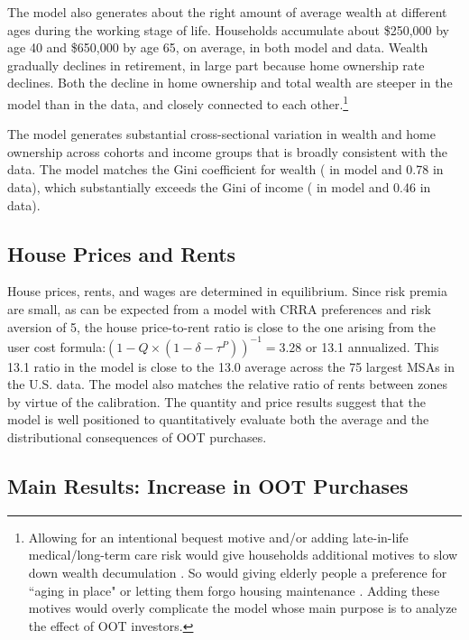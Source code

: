\documentclass[letterpaper,12pt,dvipsnames,usenames]{article}
\theoremstyle{definition}
\begin{document}
\begin{spacing}{1.25}
The model also generates about the right amount of average wealth at different ages during the working stage of life. Households accumulate about \$250,000 by age 40 and \$650,000 by age 65, on average, in both model and data. Wealth gradually declines in retirement, in large part because home ownership rate declines. Both the decline in home ownership and total wealth are steeper in the model than in the data, and closely connected to each other.\footnote{Allowing for an intentional bequest motive and/or adding late-in-life medical/long-term care risk would give households additional motives to slow down wealth decumulation \citep{ACLVN:11}. So would giving elderly people a preference for ``aging in place" or letting them forgo housing maintenance \citep{CoccoLopes:17}. Adding these motives would overly complicate the model whose main purpose is to analyze the effect of OOT investors.}


The model generates substantial cross-sectional variation in wealth and home ownership across cohorts and income groups that is broadly consistent with the data. The model matches the  Gini coefficient for wealth ({\GiniNW} in model and 0.78 in data), which substantially exceeds the Gini of income ({\GiniInc} in model and 0.46 in data). %



\subsection{House Prices and Rents}

House prices, rents, and wages are determined in equilibrium. Since risk premia are small, as can be expected from a model with CRRA preferences and risk aversion of 5, the house price-to-rent ratio is close to the one arising from the user cost formula:$(1-Q\times(1-\delta-\tau^{P}))^{-1}=3.28$ or 13.1 annualized. This 13.1 ratio in the model is close to the 13.0 average across the 75 largest MSAs in the U.S. data. The model also matches the relative ratio of rents between zones by virtue of the calibration. The quantity and price results suggest that the model is well positioned to quantitatively evaluate both the average and the distributional consequences of OOT purchases.

\subsection{Main Results: Increase in OOT Purchases}


\end{spacing}
\end{document}
